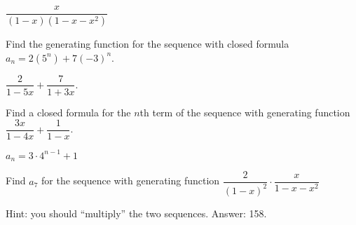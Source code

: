 \begin{questions}
	\begin{answer}
		$\dfrac{x}{(1-x)(1-x-x^2)}$  %
	\end{answer}
	
	
	
	


\question Find the generating function for the sequence with closed formula $a_n = 2(5^n) + 7(-3)^n$.

	\begin{answer}
		$\dfrac{2}{1-5x} + \dfrac{7}{1+3x}$.  %
	\end{answer}
	
	
	
	


\question Find a closed formula for the $n$th term of the sequence with generating function $\dfrac{3x}{1-4x} + \dfrac{1}{1-x}$.

	\begin{answer}
		$a_n = 3\cdot 4^{n-1} + 1$  %
	\end{answer}
	
	
	
	


\question Find $a_7$ for the sequence with generating function $\dfrac{2}{(1-x)^2}\cdot\dfrac{x}{1-x-x^2}$

	\begin{answer}
		Hint: you should ``multiply'' the two sequences.  Answer: 158.  %
	\end{answer}
	


\end{questions}

